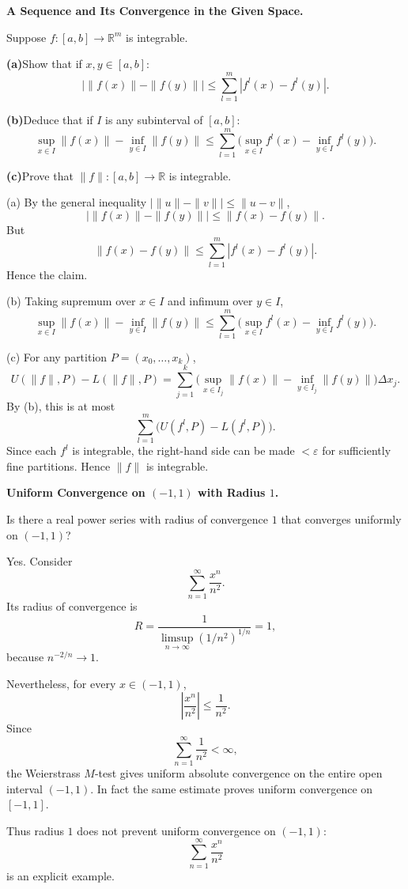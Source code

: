 \begin{problem}[CP-II-0400]
\label{prob:cp-ii-0400}
\textbf{A Sequence and Its Convergence in the Given Space.}

\hspace*{1.5em}Suppose $f:[a,b]\to\mathbb{R}^m$ is integrable.

	\par\smallskip\noindent\textbf{(a)}\quad Show that if $x,y\in[a,b]$:
	\[
	|\|f(x)\|-\|f(y)\|| \leq \sum_{l=1}^m |f^l(x)-f^l(y)|.
	\]

	\par\smallskip\noindent\textbf{(b)}\quad Deduce that if $I$ is any subinterval of $[a,b]$:
	\[
	\sup_{x\in I}\|f(x)\| - \inf_{y\in I}\|f(y)\|
	\leq \sum_{l=1}^m \Big(\sup_{x\in I} f^l(x) - \inf_{y\in I} f^l(y)\Big).
	\]

	\par\smallskip\noindent\textbf{(c)}\quad Prove that $\|f\|:[a,b]\to\mathbb{R}$ is integrable.
\end{problem}

\begin{solution}
(a) By the general inequality $|\|u\|-\|v\||\leq \|u-v\|$,
	\[
	|\|f(x)\|-\|f(y)\|| \leq \|f(x)-f(y)\|.
	\]
	But
	\[
	\|f(x)-f(y)\| \leq \sum_{l=1}^m |f^l(x)-f^l(y)|.
	\]
	Hence the claim.

	(b) Taking supremum over $x\in I$ and infimum over $y\in I$,
	\[
	\sup_{x\in I}\|f(x)\| - \inf_{y\in I}\|f(y)\|
	\leq \sum_{l=1}^m \big(\sup_{x\in I} f^l(x)-\inf_{y\in I} f^l(y)\big).
	\]

	(c) For any partition $P=(x_0,\dots,x_k)$,
	\[
	U(\|f\|,P)-L(\|f\|,P) = \sum_{j=1}^k \big(\sup_{x\in I_j}\|f(x)\|-\inf_{y\in I_j}\|f(y)\|\big)\Delta x_j.
	\]
	By (b), this is at most
	\[
	\sum_{l=1}^m \big(U(f^l,P)-L(f^l,P)\big).
	\]
	Since each $f^l$ is integrable, the right-hand side can be made $<\varepsilon$
	for sufficiently fine partitions. Hence $\|f\|$ is integrable.
\end{solution}

\begin{problem}[CP-II-0401]
\label{prob:cp-ii-0401}
\textbf{Uniform Convergence on $(-1,1)$ with Radius $1$.}

\hspace*{1.5em}Is there a real power series with radius of convergence $1$ that converges uniformly on $(-1,1)$?
\end{problem}

\begin{solution}
Yes. Consider
\[
\sum_{n=1}^{\infty}\frac{x^n}{n^2}.
\]
Its radius of convergence is
\[
R
=
\frac{1}{\limsup_{n\to\infty}(1/n^2)^{1/n}}
=
1,
\]
because \(n^{-2/n}\to1\).

Nevertheless, for every \(x\in(-1,1)\),
\[
\left|\frac{x^n}{n^2}\right|
\le
\frac1{n^2}.
\]
Since
\[
\sum_{n=1}^{\infty}\frac1{n^2}<\infty,
\]
the Weierstrass \(M\)-test gives uniform absolute convergence on the entire open
interval \((-1,1)\). In fact the same estimate proves uniform convergence on
\([-1,1]\).

Thus radius \(1\) does not prevent uniform convergence on \((-1,1)\):
\[
\boxed{\sum_{n=1}^{\infty}\frac{x^n}{n^2}}
\]
is an explicit example.
\end{solution}

